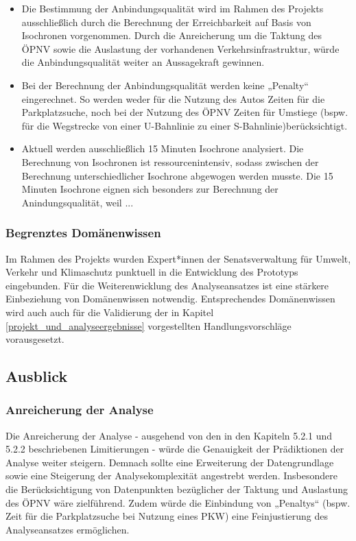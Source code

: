 \begin{itemize}

    \item Die Bestimmung der Anbindungsqualität wird im Rahmen des Projekts ausschließlich durch die Berechnung der Erreichbarkeit auf Basis von Isochronen vorgenommen. Durch die Anreicherung um die Taktung des ÖPNV sowie die Auslastung der vorhandenen Verkehrsinfrastruktur, würde die Anbindungsqualität weiter an Aussagekraft gewinnen.

    \item Bei der Berechnung der Anbindungsqualität werden keine „Penalty“ eingerechnet. So werden weder für die Nutzung des Autos Zeiten für die Parkplatzsuche, noch bei der Nutzung des ÖPNV Zeiten für Umstiege (bspw. für die Wegstrecke von einer U-Bahnlinie zu einer S-Bahnlinie)berücksichtigt.
    \item Aktuell werden ausschließlich 15 Minuten Isochrone analysiert​. Die Berechnung von Isochronen ist ressourcenintensiv, sodass zwischen der Berechnung unterschiedlicher Isochrone abgewogen werden musste. Die 15 Minuten Isochrone eignen sich besonders zur Berechnung der Anindungsqualität, weil ...
\end{itemize}


\subsubsection{Begrenztes Domänenwissen}
Im Rahmen des Projekts wurden Expert*innen der Senatsverwaltung für Umwelt, Verkehr und Klimaschutz punktuell in die Entwicklung des Prototyps eingebunden. Für die Weiterenwicklung des Analyseansatzes ist eine stärkere Einbeziehung von Domänenwissen notwendig. Entsprechendes Domänenwissen wird auch auch für die Validierung der in Kapitel \ref{projekt_und_analyseergebnisse} vorgestellten Handlungsvorschläge vorausgesetzt.

\subsection{Ausblick}

\subsubsection{Anreicherung der Analyse}
Die Anreicherung der Analyse - ausgehend von den in den Kapiteln 5.2.1 und 5.2.2 beschriebenen Limitierungen - würde die  Genauigkeit der Prädiktionen der Analyse weiter steigern. Demnach sollte eine Erweiterung der Datengrundlage sowie eine Steigerung der Analysekomplexität angestrebt werden. Insbesondere die Berücksichtigung von Datenpunkten bezüglicher der Taktung und Auslastung des ÖPNV wäre zielführend. Zudem würde die Einbindung von „Penaltys“ (bspw. Zeit für die Parkplatzsuche bei Nutzung eines PKW) eine Feinjustierung des Analyseansatzes ermöglichen.

